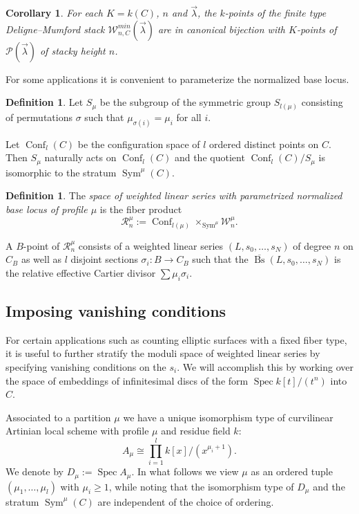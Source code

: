 \documentclass[a4paper,12pt]{amsart}
\newtheorem{cor}[thm]{Corollary}
\theoremstyle{definition}
\newtheorem{defn}[thm]{Definition}
\newcommand{\cW}{\mathcal{W}}
\newcommand{\cR}{\mathcal{R}}
\DeclareMathOperator{\Bs}{Bs}
\DeclareMathOperator{\Conf}{Conf}
\newcommand{\Pcv}{\mathcal{P}(\vec{\lambda})}
\newcommand{\lambdavec}{{\vec{\lambda}}}
\DeclareMathOperator{\Spec}{Spec}
\DeclareMathOperator{\Sym}{Sym}
\begin{document}
	\begin{cor} For each $K = k(C)$, $n$ and $\vec{\lambda}$, the $k$-points of the finite type Deligne--Mumford stack $\cW^{min}_{n,C}(\lambdavec)$ are in canonical bijection with $K$-points of $\Pcv$ of stacky height $n$.
		
	\end{cor}
	
	For some applications it is convenient to parameterize the normalized base locus. 
	
	\begin{defn}\label{Smu-definition}
		Let $S_\mu$ be the subgroup of the symmetric group $S_{l(\mu)}$ consisting of permutations $\sigma$ such that $\mu_{\sigma(i)}=\mu_i$ for all $i$.
	\end{defn}
	
	Let $\Conf_l(C)$ be the configuration space of $l$ ordered distinct points on $C$. Then $S_\mu$ naturally acts on $\Conf_l(C)$ and the quotient $\Conf_l(C)/S_\mu$ is isomorphic to the stratum $\Sym^\mu(C)$.
	
	\begin{defn}\label{def:moduli-interp-rnmu} The \emph{space of weighted linear series with parametrized normalized base locus of profile $\mu$} is the fiber product
		$$
		\cR^\mu_n := \Conf_{l(\mu)} \times_{\Sym^{\mu}} \cW^\mu_n. 
		$$
	\end{defn}
	
	A $B$-point of $\cR^\mu_n$ consists of a weighted linear series $(L, s_0, \ldots, s_N)$ of degree $n$ on $C_B$ as well as $l$ disjoint sections $\sigma_i : B \to C_B$ such that the $\overline{\Bs}(L, s_0, \ldots, s_N)$ is the relative effective Cartier divisor $\sum \mu_i \sigma_i$. 
	
	\subsection{Imposing vanishing conditions}
	
	For certain applications such as counting elliptic surfaces with a fixed fiber type, it is useful to further stratify the moduli space of weighted linear series by specifying vanishing conditions on the $s_i$. We will accomplish this by working over the space of embeddings of infinitesimal discs of the form $\Spec k[t]/(t^n)$ into $C$.
	
	Associated to a partition $\mu$ we have a unique isomorphism type of curvilinear Artinian local scheme with profile $\mu$ and residue field $k$: 
	$$
	A_\mu \cong \prod_{i = 1}^l k[x]/(x^{\mu_i + 1}). 
	$$
	We denote by $D_\mu := \Spec A_\mu$. In what follows we view $\mu$ as an ordered tuple $(\mu_1, \ldots, \mu_l)$ with $\mu_i\geq1$, while noting that the isomorphism type of $D_\mu$ and the stratum $\Sym^\mu(C)$ are independent of the choice of ordering. 
	
\end{document}
